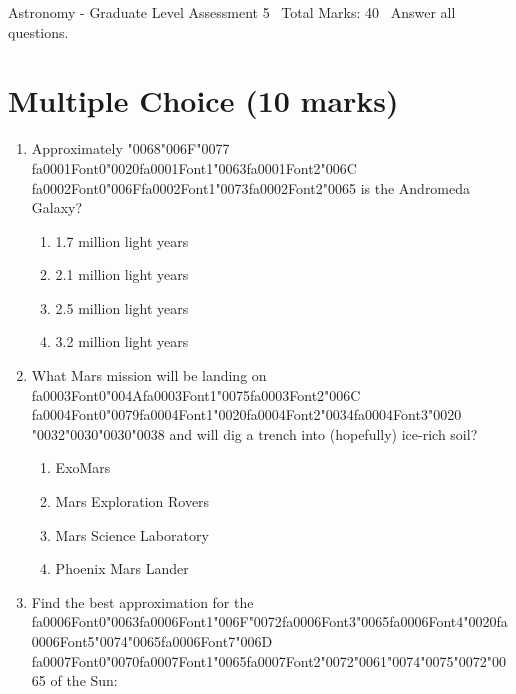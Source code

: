 \documentclass[12pt]{article}
\begin{document}
\begin{center}
Astronomy - Graduate Level Assessment 5 \
Total Marks: 40 \
Answer all questions.
\end{center}

\section*{Multiple Choice (10 marks)}
\begin{enumerate}[label=\arabic*.]
\item Approximately {\char"0068}{\char"006F}{\char"0077} {\csname fa0001Font0\endcsname\char"0020}{\csname fa0001Font1\endcsname\char"0063}{\csname fa0001Font2\endcsname\char"006C} {\csname fa0002Font0\endcsname\char"006F}{\csname fa0002Font1\endcsname\char"0073}{\csname fa0002Font2\endcsname\char"0065} is the Andromeda Galaxy?
\begin{enumerate}[label=(\alph*)]
    \item 1.7 million light years
    \item 2.1 million light years
    \item 2.5 million light years
    \item 3.2 million light years
\end{enumerate}
\item What Mars mission will be landing on {\csname fa0003Font0\endcsname\char"004A}{\csname fa0003Font1\endcsname\char"0075}{\csname fa0003Font2\endcsname\char"006C} {\csname fa0004Font0\endcsname\char"0079}{\csname fa0004Font1\endcsname\char"0020}{\csname fa0004Font2\endcsname\char"0034}{\csname fa0004Font3\endcsname\char"0020} {\char"0032}{\char"0030}{\char"0030}{\char"0038} and will dig a trench into (hopefully)
ice-rich soil?
\begin{enumerate}[label=(\alph*)]
    \item ExoMars
    \item Mars Exploration Rovers
    \item Mars Science Laboratory
    \item Phoenix Mars Lander
\end{enumerate}
\item Find the best approximation for the {\csname fa0006Font0\endcsname\char"0063}{\csname fa0006Font1\endcsname\char"006F}{\char"0072}{\csname fa0006Font3\endcsname\char"0065}{\csname fa0006Font4\endcsname\char"0020}{\csname fa0006Font5\endcsname\char"0074}{\char"0065}{\csname fa0006Font7\endcsname\char"006D} {\csname fa0007Font0\endcsname\char"0070}{\csname fa0007Font1\endcsname\char"0065}{\csname fa0007Font2\endcsname\char"0072}{\char"0061}{\char"0074}{\char"0075}{\char"0072}{\char"0065} of the Sun:

\end{enumerate}
\end{document}

